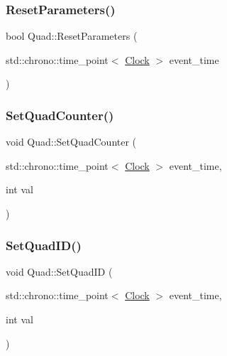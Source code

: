 \mbox{\label{classQuad_af7c18022d7db1ad20bb7a1e1bd1ffb90}} 
\subsubsection{\texorpdfstring{Reset\+Parameters()}{ResetParameters()}}
{\footnotesize\ttfamily bool Quad\+::\+Reset\+Parameters (\begin{DoxyParamCaption}\item[{std\+::chrono\+::time\+\_\+point$<$ \mbox{\hyperlink{universe_8h_a0ef8d951d1ca5ab3cfaf7ab4c7a6fd80}{Clock}} $>$}]{event\+\_\+time }\end{DoxyParamCaption})}

\mbox{\label{classQuad_a66ba58a32cf7b351e3e155efbdb46f8e}} 
\subsubsection{\texorpdfstring{Set\+Quad\+Counter()}{SetQuadCounter()}}
{\footnotesize\ttfamily void Quad\+::\+Set\+Quad\+Counter (\begin{DoxyParamCaption}\item[{std\+::chrono\+::time\+\_\+point$<$ \mbox{\hyperlink{universe_8h_a0ef8d951d1ca5ab3cfaf7ab4c7a6fd80}{Clock}} $>$}]{event\+\_\+time,  }\item[{int}]{val }\end{DoxyParamCaption})\hspace{0.3cm}{\ttfamily [inline]}}

\mbox{\label{classQuad_a9900acc75445ebc71aba2307e3fe0131}} 
\subsubsection{\texorpdfstring{Set\+Quad\+I\+D()}{SetQuadID()}}
{\footnotesize\ttfamily void Quad\+::\+Set\+Quad\+ID (\begin{DoxyParamCaption}\item[{std\+::chrono\+::time\+\_\+point$<$ \mbox{\hyperlink{universe_8h_a0ef8d951d1ca5ab3cfaf7ab4c7a6fd80}{Clock}} $>$}]{event\+\_\+time,  }\item[{int}]{val }\end{DoxyParamCaption})\hspace{0.3cm}{\ttfamily [inline]}}

